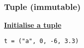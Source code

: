 \subsubsection{Tuple (immutable)}
{\centering\underline{\textbf{Initialise a tuple}} \par}
\begin{lstlisting}
t = ("a", 0, -6, 3.3)
\end{lstlisting}